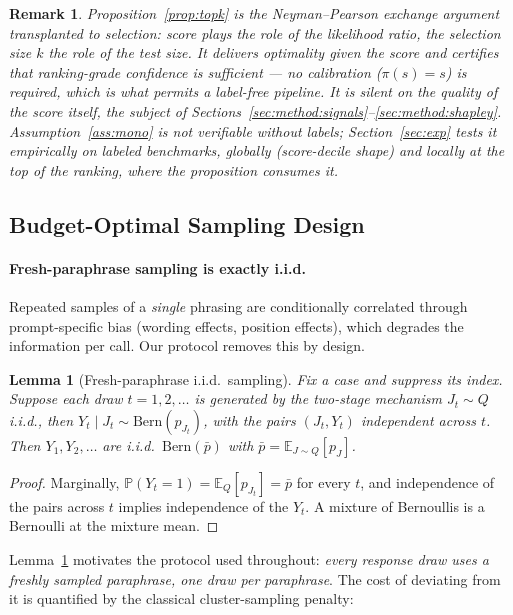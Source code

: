 \documentclass[11pt]{article}
\newtheorem{lemma}{Lemma}
\newtheorem{remark}{Remark}
\newcommand{\pbar}{\bar{p}}
\newcommand{\E}{\mathbb{E}}
\newcommand{\Prob}{\mathbb{P}}
\newcommand{\Bern}{\mathrm{Bern}}
\newcommand{\score}{s}
\begin{document}
\begin{remark}
Proposition~\ref{prop:topk} is the Neyman--Pearson exchange argument
transplanted to selection: score plays the role of the likelihood ratio,
the selection size $k$ the role of the test size. It delivers optimality
\emph{given} the score and certifies that ranking-grade confidence is
sufficient --- no calibration ($\pi(\score) = \score$) is required,
which is what permits a label-free pipeline. It is silent on the quality
of the score itself, the subject of
Sections~\ref{sec:method:signals}--\ref{sec:method:shapley}.
Assumption~\ref{ass:mono} is not verifiable without labels;
Section~\ref{sec:exp} tests it empirically on labeled benchmarks,
globally (score-decile shape) and locally at the top of the ranking,
where the proposition consumes it.
\end{remark}

\subsection{Budget-Optimal Sampling Design}
\label{sec:method:design}

\paragraph{Fresh-paraphrase sampling is exactly i.i.d.}
Repeated samples of a \emph{single} phrasing are conditionally correlated
through prompt-specific bias (wording effects, position effects), which
degrades the information per call. Our protocol removes this by design.

\begin{lemma}[Fresh-paraphrase i.i.d.\ sampling]
\label{lem:iid}
Fix a case and suppress its index. Suppose each draw $t = 1, 2, \dots$ is
generated by the two-stage mechanism $J_t \sim Q$ i.i.d., then
$Y_t \mid J_t \sim \Bern(p_{J_t})$, with the pairs $(J_t, Y_t)$
independent across $t$. Then $Y_1, Y_2, \dots$ are i.i.d.\
$\Bern(\pbar)$ with $\pbar = \E_{J\sim Q}[p_J]$.
\end{lemma}

\begin{proof}
Marginally, $\Prob(Y_t = 1) = \E_Q[p_{J_t}] = \pbar$ for every $t$, and
independence of the pairs across $t$ implies independence of the
$Y_t$. A mixture of Bernoullis is a Bernoulli at the mixture mean.
\end{proof}

Lemma~\ref{lem:iid} motivates the protocol used throughout: \emph{every
response draw uses a freshly sampled paraphrase, one draw per
paraphrase}. The cost of deviating from it is quantified by the
classical cluster-sampling penalty:
\end{document}
